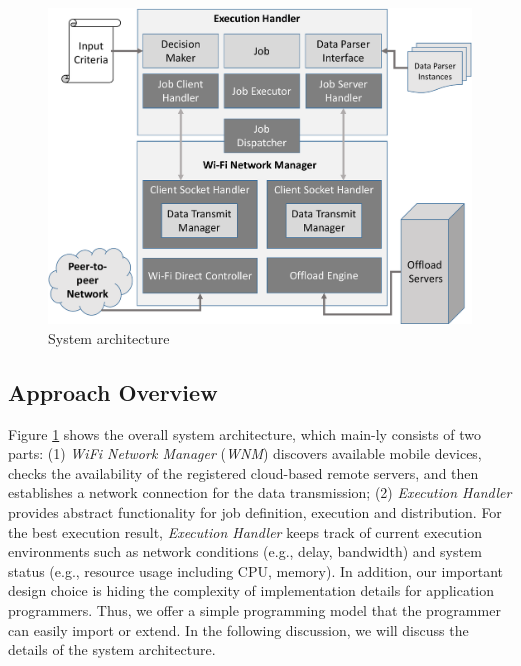 \documentclass{sig-alternate}[10pt]
\begin{document}
\begin{figure}
	\centering	
		\includegraphics[width=.95\linewidth]{data/jobShareArch.pdf}	
	\caption{System architecture}
	\label{fig:architecture}
\end{figure}


\subsection{Approach Overview}
Figure \ref{fig:architecture} shows the overall system architecture, which main-ly consists of two parts: (1) \emph{WiFi Network Manager} (\emph{WNM}) discovers available mobile devices, checks the availability of the registered cloud-based remote servers, and then establishes a network connection for the data transmission; (2) \emph{Execution Handler} provides abstract functionality for job definition, execution and distribution. For the best execution result, \emph{Execution Handler} keeps track of current execution environments such as network conditions (e.g., delay, bandwidth) and system status (e.g., resource usage including CPU, memory). In addition, our important design choice is hiding the complexity of implementation details for application programmers. Thus, we offer a simple programming model that the programmer can easily import or extend. In the following discussion, we will discuss the details of the system architecture.

\end{document}
